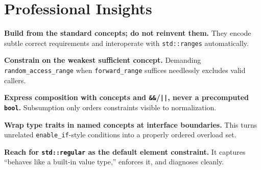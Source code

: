 \section{Professional Insights}
\label{sec:c20-concepts-ii-insights}

\textbf{Build from the standard concepts; do not reinvent them.} They encode subtle correct requirements and interoperate with \texttt{std::ranges} automatically.

\textbf{Constrain on the weakest sufficient concept.} Demanding \texttt{random\_access\_range} when \texttt{forward\_range} suffices needlessly excludes valid callers.

\textbf{Express composition with concepts and \texttt{\&\&}/\texttt{||}, never a precomputed \texttt{bool}.} Subsumption only orders constraints visible to normalization.

\textbf{Wrap type traits in named concepts at interface boundaries.} This turns unrelated \texttt{enable\_if}-style conditions into a properly ordered overload set.

\textbf{Reach for \texttt{std::regular} as the default element constraint.} It captures ``behaves like a built-in value type,'' enforces it, and diagnoses cleanly.
